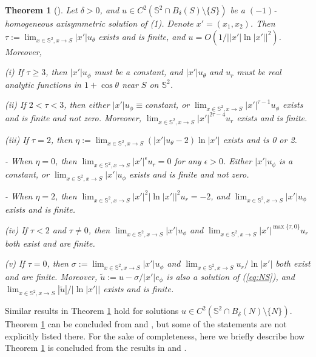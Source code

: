 \documentclass[12pt]{article}
\newtheorem{theorem}{Theorem}
\begin{document}
\begin{theorem}[\cite{LLY1,LLY2}] \label{thm:expansion}
	Let $\delta>0$, and $u\in C^2(\mathbb{S}^2 \cap B_\delta(S)\setminus\{S\})$ be a $(-1)$-homogeneous axisymmetric solution of (1). Denote $x'=(x_1,x_2)$. Then $\tau:= \lim_{x\in\mathbb{S}^2,x\to S} |x'| u_\theta$ exists and is finite, and $u = O(1/\big| |x'| \ln |x'| \big|^2)$. Moreover, 
		
	{\rm (i)} If $\tau \ge 3$, then $|x'| u_\phi$ must be a constant, and $|x'| u_\theta$ and $u_r$ must be real analytic functions in $1+\cos\theta$ near $S$ on $\mathbb{S}^2$. 
	
	{\rm (ii)} If $2 < \tau < 3$, then either $|x'|u_\phi \equiv $constant, or $\lim_{x\in\mathbb{S}^2,x\to S} |x'|^{\tau-1} u_\phi$ exists and is finite and not zero. Moreover, $\lim_{x\in\mathbb{S}^2,x\to S} |x'|^{2\tau-4} u_r$ exists and is finite. 
	
	{\rm (iii)} If $\tau=2$, then $\eta:= \lim_{x\in \mathbb{S}^2, x\to S} (|x'|u_\theta-2)\ln |x'|$ exists and is 0 or 2. 
	
	- When $\eta=0$, then $\lim_{x\in\mathbb{S}^2,x\to S} |x'|^{\epsilon} u_r = 0$ for any $\epsilon>0$. Either $|x'| u_\phi$ is a constant, or $\lim_{x\in\mathbb{S}^2,x\to S} |x'| u_\phi$ exists and is finite and not zero. 
	
	- When $\eta=2$, then $\lim_{x\in\mathbb{S}^2,x\to S} |x'|^2 \big| \ln |x'| \big|^2 u_r = -2$, and $\lim_{x\in\mathbb{S}^2,x\to S}|x'|u_\phi$ exists and is finite. 
	
	{\rm (iv)} If $\tau < 2$ and $\tau \not= 0$, then $\lim_{x\in\mathbb{S}^2,x\to S} |x'|u_\phi$ and $\lim_{x\in\mathbb{S}^2,x\to S} |x'|^{\max\{\tau,0\}} u_r$ both exist and are finite. 
	
	{\rm (v)} If $\tau=0$, then $\sigma:=\lim_{x\in\mathbb{S}^2,x\to S} |x'|u_\phi$ and 
	$\lim_{x\in\mathbb{S}^2,x\to S}u_r/\ln |x'|$ both exist and are finite. 
	 Moreover, $\tilde{u}:=u-\sigma/|x'|e_{\phi}$ is also a solution of (\ref{eq:NS}), and 
	 $\lim_{x\in\mathbb{S}^2,x\to S} |\tilde{u}|/\big| \ln |x'| \big|$ exists and is finite. 
\end{theorem}

\medskip

Similar results in Theorem \ref{thm:expansion} hold for solutions $u\in C^2(\mathbb{S}^2 \cap B_\delta(N)\setminus\{N\})$. Theorem \ref{thm:expansion} can be concluded from \cite{LLY1} and \cite{LLY2}, but some of the statements are not explicitly listed there. For the sake of completeness, here we briefly describe how Theorem \ref{thm:expansion} is concluded from the results in \cite{LLY1} and \cite{LLY2}. 
\end{document}
